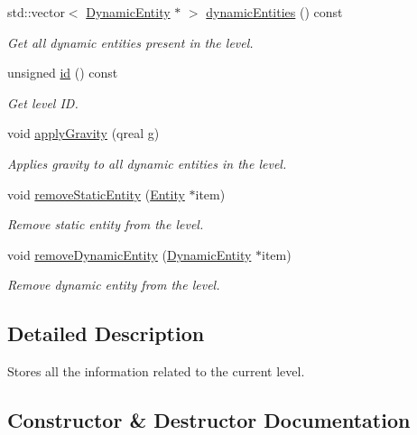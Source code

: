 \begin{DoxyCompactItemize}
std\+::vector$<$ \hyperlink{class_dynamic_entity}{Dynamic\+Entity} $\ast$ $>$ \hyperlink{class_level_af2f9960227070d93bc3fb457267c8d9a}{dynamic\+Entities} () const
\begin{DoxyCompactList}\small\item\em Get all dynamic entities present in the level. \end{DoxyCompactList}\item 
unsigned \hyperlink{class_level_afa0e14e0f2233497373be981c5ffdfa8}{id} () const
\begin{DoxyCompactList}\small\item\em Get level ID. \end{DoxyCompactList}\item 
void \hyperlink{class_level_aeacba6d47f7b2ccadebed8cef3ea6695}{apply\+Gravity} (qreal g)
\begin{DoxyCompactList}\small\item\em Applies gravity to all dynamic entities in the level. \end{DoxyCompactList}\item 
void \hyperlink{class_level_a02c2ce88ee6a232d2e192b1ad2982b23}{remove\+Static\+Entity} (\hyperlink{class_entity}{Entity} $\ast$item)
\begin{DoxyCompactList}\small\item\em Remove static entity from the level. \end{DoxyCompactList}\item 
void \hyperlink{class_level_a55628d95ef5195f50afbb46c91b8ccdf}{remove\+Dynamic\+Entity} (\hyperlink{class_dynamic_entity}{Dynamic\+Entity} $\ast$item)
\begin{DoxyCompactList}\small\item\em Remove dynamic entity from the level. \end{DoxyCompactList}\end{DoxyCompactItemize}


\subsection{Detailed Description}
Stores all the information related to the current level. 

\subsection{Constructor \& Destructor Documentation}
\mbox{\label{class_level_ae92fa1883989c6a0559d4ee8cd5f63e3}} 
